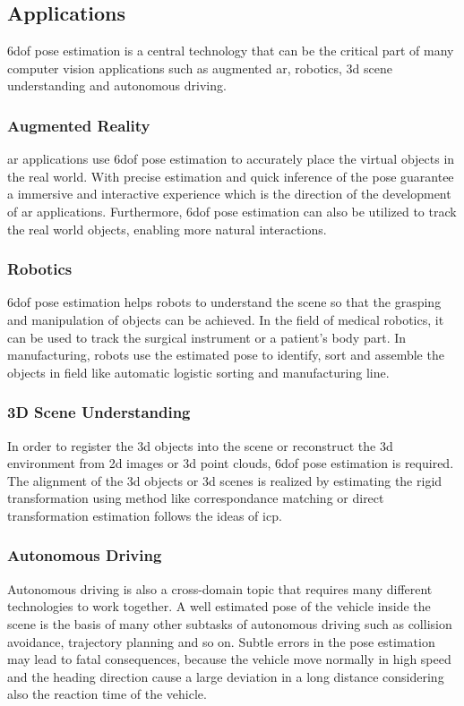 \documentclass[12pt,DIV14,BCOR12mm,a4paper,footinclude=false,headinclude,parskip=half-,twoside,openright,cleardoublepage=empty,toc=index,bibliography=totoc,listof=totoc]{scrreprt}
\numberwithin{equation}{chapter}
\begin{document}
\subsection{Applications}
\gls{6dof} pose estimation is a central technology that can be the critical part of many computer vision applications such as augmented \gls{ar}, robotics, \gls{3d} scene understanding and autonomous driving.

\subsubsection{Augmented Reality}
\gls{ar} applications use \gls{6dof} pose estimation to accurately place the virtual objects in the real world. With precise estimation and quick inference of the pose guarantee a immersive and interactive experience 
which is the direction of the development of \gls{ar} applications\cite{9836663}. Furthermore, \gls{6dof} pose estimation can also be utilized to track the real world objects, enabling more natural interactions.

\subsubsection{Robotics}
\gls{6dof} pose estimation helps robots to understand the scene so that the grasping and manipulation of objects can be achieved. In the field of medical robotics, it can be used to track the surgical instrument or a patient's body part\cite{cao20236impose}. In manufacturing, robots use the estimated pose to identify, sort and assemble the objects in field like automatic logistic sorting and manufacturing line.

\subsubsection{3D Scene Understanding}
In order to register the \gls{3d} objects into the scene or reconstruct the \gls{3d} environment from \gls{2d} images or \gls{3d} point clouds, \gls{6dof} pose estimation is required. The alignment of the \gls{3d} objects or \gls{3d} scenes is realized by estimating the rigid transformation using method like correspondance matching\cite{qin2022geometric} or direct transformation estimation\cite{fu2021robust} follows the ideas of \gls{icp}\cite{Besl1992AMF}.

\subsubsection{Autonomous Driving}
Autonomous driving is also a cross-domain topic that requires many different technologies to work together. A well estimated pose of the vehicle inside the scene is the basis of many other subtasks of autonomous driving such as collision avoidance, trajectory planning and so on. Subtle errors in the pose estimation may lead to fatal consequences\cite{auto}, because the vehicle move normally in high speed and the heading direction cause a large deviation in a long distance considering also the reaction time of the vehicle.
\end{document}
